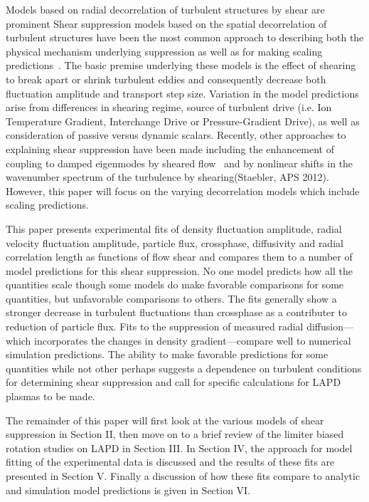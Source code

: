 \documentclass[aip,pop,amsmath,amssymb,preprint,superscriptaddress]{revtex4-1} %
\begin{document}
Models based on radial decorrelation of turbulent structures by shear are prominent Shear suppression models based on the spatial decorrelation of turbulent structures have been the most common approach to describing both the physical mechanism underlying suppression as well as for making scaling predictions~\cite{terry00}. The basic premise underlying these models is the effect of shearing to break apart or shrink turbulent eddies and consequently decrease both fluctuation amplitude and transport step size. Variation in the model predictions arise from differences in shearing regime, source of turbulent drive (i.e. Ion Temperature Gradient, Interchange Drive or Pressure-Gradient Drive), as well as consideration of passive versus dynamic scalars. Recently, other approaches to explaining shear suppression have been made including the enhancement of coupling to damped eigenmodes by sheared flow~\cite{terry06} and by nonlinear shifts in the wavenumber spectrum of the turbulence by shearing(Staebler, APS 2012). However, this paper will focus on the varying decorrelation models which include scaling predictions. 

This paper presents experimental fits of density fluctuation amplitude, radial velocity fluctuation amplitude, particle flux, crossphase, diffusivity and radial correlation length as functions of flow shear and compares them to a number of model predictions for this shear suppression. No one model predicts how all the quantities scale though some models do make favorable comparisons for some quantities, but unfavorable comparisons to others. The fits generally show a stronger decrease in turbulent fluctuations than crossphase as a contributer to reduction of particle flux. Fits to the suppression of measured radial diffusion---which incorporates the changes in density gradient---compare well to numerical simulation predictions. The ability to make favorable predictions for some quantities while not other perhaps suggests a dependence on turbulent conditions for determining shear suppression and call for specific calculations for LAPD plasmas to be made.

The remainder of this paper will first look at the various models of shear suppression in Section II, then move on to a brief review of the limiter biased rotation studies on LAPD in Section III. In Section IV, the approach for model fitting of the experimental data is discussed and the results of these fits are presented in Section V. Finally a discussion of how these fits compare to analytic and simulation model predictions is given in Section VI.
\end{document}
